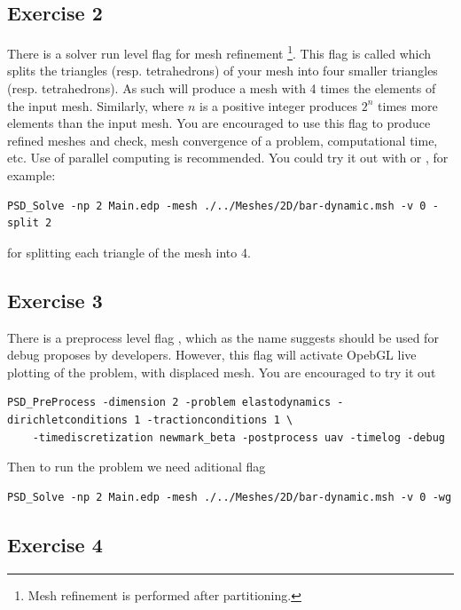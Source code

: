 \subsection{Exercise  2}

There is a solver run level flag for mesh refinement \footnote{Mesh refinement is performed after partitioning.}. This flag is called  which splits the triangles (resp. tetrahedrons) of your mesh into  four smaller  triangles (resp. tetrahedrons). As such  will produce a mesh with 4 times the elements of the input mesh. Similarly,  where $n$ is a positive integer produces $2^n$ times more elements than the input mesh. You are encouraged to use this  flag to produce refined meshes and check, mesh convergence of a problem, computational time, etc. Use of parallel computing is recommended. You could try it out with  or , for example:

\begin{lstlisting}[style=BashInputStyle]
	PSD_Solve -np 2 Main.edp -mesh ./../Meshes/2D/bar-dynamic.msh -v 0 -split 2
\end{lstlisting}

for splitting each triangle of the mesh   into 4. 


\subsection{Exercise  3}

There is a preprocess level flag , which as the name suggests should be used for debug proposes by developers. However, this flag will activate OpebGL live plotting of the problem, with displaced mesh. You are encouraged to try it out 

\begin{lstlisting}[style=BashInputStyle]
	PSD_PreProcess -dimension 2 -problem elastodynamics -dirichletconditions 1 -tractionconditions 1 \
	-timediscretization newmark_beta -postprocess uav -timelog -debug
\end{lstlisting}

Then to run the problem we need aditional  flag

\begin{lstlisting}[style=BashInputStyle]
	PSD_Solve -np 2 Main.edp -mesh ./../Meshes/2D/bar-dynamic.msh -v 0 -wg
\end{lstlisting}

\subsection{Exercise  4}

